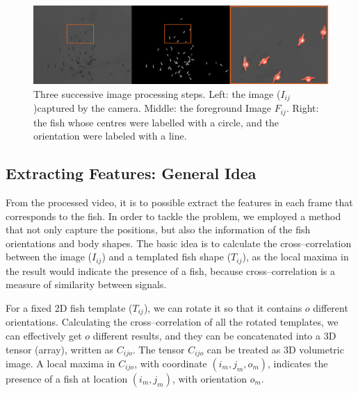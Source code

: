 \documentclass[11pt,twoside]{report}
\begin{document}
\begin{figure}
  \includegraphics[width=\linewidth,outer]{2d-processing.png}
  \caption[Two dimensional image processing.]{Three successive image processing steps. Left: the image ($I_{ij}$)captured by the camera. Middle: the foreground Image $F_{ij}$. Right: the fish whose centres were labelled with a circle, and the orientation were labeled with a line.}
  \label{fig:2d_process}
\end{figure}


\subsection{Extracting Features: General Idea}
\label{section:oishi}

From the processed video, it is to possible extract the features
in each frame that corresponds to the fish. In order to tackle the problem, we employed a method that not only capture the positions, but also the information of the fish orientations and body shapes. The basic idea is to calculate the cross--correlation between the image ($I_{ij}$) and a templated fish shape ($T_{ij}$), as the local maxima in the result would indicate the presence of a fish, because cross--correlation is a measure of similarity between signals.

For a fixed 2D fish template ($T_{ij}$), we can rotate it so that it contains $o$ different orientations. Calculating the cross--correlation of all the rotated templates, we can effectively get $o$ different results, and they can be concatenated into a 3D tensor (array), written as $C_{ijo}$. The tensor $C_{ijo}$ can be treated as 3D volumetric image. A local maxima in $C_{ijo}$, with coordinate $(i_m, j_m, o_m)$, indicates the presence of a fish at location $(i_m, j_m)$, with orientation $o_m$.
\end{document}
